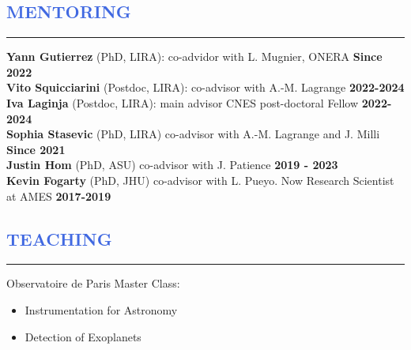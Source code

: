 \documentclass[11pt]{article}
\begin{document}
\vspace{-0.8cm}
\textcolor{RoyalBlue}{\section{\large MENTORING}
\vspace{-0.35cm}\hrule}
\vspace{0.4cm}
{\small
\textbf{Yann Gutierrez} (PhD, LIRA): co-advidor with L. Mugnier, ONERA \hfill \textbf{Since 2022}\\
\textbf{Vito Squicciarini} (Postdoc, LIRA): co-advisor with A.-M. Lagrange \hfill \textbf{2022-2024}\\
\textbf{Iva Laginja} (Postdoc, LIRA): main advisor CNES post-doctoral Fellow \hfill \textbf{2022-2024}\\
\textbf{Sophia Stasevic} (PhD, LIRA) co-advisor with A.-M. Lagrange and J. Milli \hfill \textbf{Since 2021}\\
\textbf{Justin Hom} (PhD, ASU) co-advisor with J. Patience \hfill \textbf{2019 - 2023}\\
\textbf{Kevin Fogarty} (PhD, JHU) co-advisor with L. Pueyo. Now Research Scientist at AMES \hfill \textbf{2017-2019}\\
}
\vspace{-0.cm}
\textcolor{RoyalBlue}{\section{\large TEACHING}
\vspace{-0.35cm}\hrule}
\vspace{0.4cm}
Observatoire de Paris Master Class: 
\begin{itemize} \itemsep -2pt
    \item Instrumentation for Astronomy 
    \item Detection of Exoplanets
\end{itemize}



\end{document}
